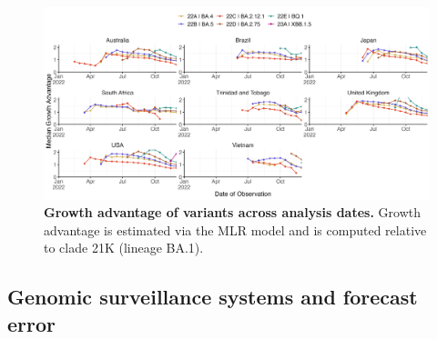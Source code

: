\documentclass[11pt,oneside,letterpaper]{article}
\begin{document}
\begin{figure}[H]
	\centering
    \includegraphics[width=1.0\textwidth]{figures/ga_estimates.png}
	\caption{
		\textbf{Growth advantage of variants across analysis dates.}
		Growth advantage is estimated via the MLR model and is computed relative to clade 21K (lineage BA.1).
	}
	\label{fig:ga_estimates}
\end{figure}

\subsection*{Genomic surveillance systems and forecast error}
\end{document}
